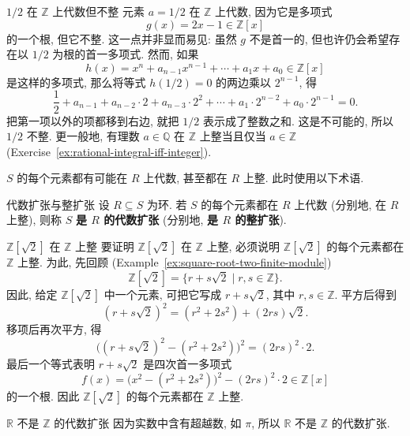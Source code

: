 \begin{Example}{$1/2$ 在 $\mathbb{Z}$ 上代数但不整}\leavevmode\label{ex:half-algebraic-not-integral}
  元素 $a=1/2$ 在 $\mathbb{Z}$ 上代数, 因为它是多项式
  \[
    g(x)=2x-1\in\mathbb{Z}[x]
  \]
  的一个根, 但它不整. 这一点并非显而易见: 虽然 $g$ 不是首一的, 但也许仍会希望存在以 $1/2$ 为根的首一多项式. 然而, 如果
  \[
    h(x)=x^{n}+a_{n-1}x^{n-1}+\cdots+a_{1}x+a_{0}\in\mathbb{Z}[x]
  \]
  是这样的多项式, 那么将等式 $h(1/2)=0$ 的两边乘以 $2^{n-1}$, 得
  \[
    \frac{1}{2}+a_{n-1}+a_{n-2}\cdot2+a_{n-3}\cdot2^{2}
      +\cdots+a_{1}\cdot2^{n-2}+a_{0}\cdot2^{n-1}=0.
  \]
  \BookPairedNote
    {把第一项以外的项都移到右边, 就把 $1/2$ 表示成了整数之和. 这是不可能的, 所以 $1/2$ 不整.}
    {更一般地, 有理数 $a\in\mathbb{Q}$ 在 $\mathbb{Z}$ 上整当且仅当 $a\in\mathbb{Z}$ (Exercise~\ref{ex:rational-integral-iff-integer}).}
\end{Example}

$S$ 的每个元素都有可能在 $R$ 上代数, 甚至都在 $R$ 上整. 此时使用以下术语.

\begin{Definition}{代数扩张与整扩张}\leavevmode\label{def:algebraic-and-integral-extensions}
  设 $R\subseteq S$ 为环. 若 $S$ 的每个元素都在 $R$ 上代数 (分别地, 在 $R$ 上整), 则称 $S$ \textbf{是 $R$ 的代数扩张} (分别地, \textbf{是 $R$ 的整扩张}).
\end{Definition}

\begin{Example}{{\textmd{$\mathbb{Z}[\sqrt{2}]$} 在 $\mathbb{Z}$ 上整}}\leavevmode\label{ex:sqrt-two-ring-integral}
  要证明 $\mathbb{Z}[\sqrt{2}]$ 在 $\mathbb{Z}$ 上整, 必须说明 $\mathbb{Z}[\sqrt{2}]$ 的每个元素都在 $\mathbb{Z}$ 上整. 为此, 先回顾 (Example~\ref{ex:square-root-two-finite-module})
  \[
    \mathbb{Z}[\sqrt{2}]=\{r+s\sqrt{2}\mid r,s\in\mathbb{Z}\}.
  \]
  因此, 给定 $\mathbb{Z}[\sqrt{2}]$ 中一个元素, 可把它写成 $r+s\sqrt{2}$, 其中 $r,s\in\mathbb{Z}$. 平方后得到
  \[
    (r+s\sqrt{2})^{2}=(r^{2}+2s^{2})+(2rs)\sqrt{2}.
  \]
  移项后再次平方, 得
  \[
    \bigl((r+s\sqrt{2})^{2}-(r^{2}+2s^{2})\bigr)^{2}=(2rs)^{2}\cdot2.
  \]
  最后一个等式表明 $r+s\sqrt{2}$ 是四次首一多项式
  \[
    f(x)=\bigl(x^{2}-(r^{2}+2s^{2})\bigr)^{2}-(2rs)^{2}\cdot2\in\mathbb{Z}[x]
  \]
  的一个根. 因此 $\mathbb{Z}[\sqrt{2}]$ 的每个元素都在 $\mathbb{Z}$ 上整.
\end{Example}

\begin{Example}{$\mathbb{R}$ 不是 $\mathbb{Z}$ 的代数扩张}\leavevmode\label{ex:reals-not-algebraic-over-integers}
  因为实数中含有超越数, 如 $\pi$, 所以 $\mathbb{R}$ 不是 $\mathbb{Z}$ 的代数扩张.
\end{Example}

